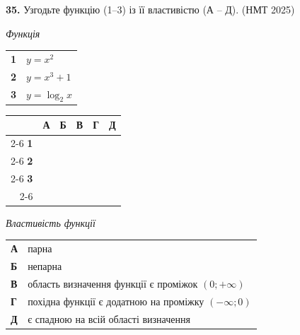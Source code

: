 \documentclass[14pt]{extarticle}
\newcommand{\nmtyear}[1]{\hfill{\small\color{yearcolor}(НМТ #1)}}
\begin{document}
\vspace{0.7cm}

\noindent\textbf{35.} Узгодьте функцію (1–3) із її властивістю (А – Д). \nmtyear{2025}

\vspace{0.3cm}

\noindent
\begin{minipage}[t]{0.45\textwidth}
    \textit{Функція} \par \vspace{0.2cm}
    \begin{tabular}{@{}p{0.5cm} p{5cm}@{}}
    \textbf{1} & $y=x^2$ \\[0.3cm]
    \textbf{2} & $y=x^3+1$ \\[0.3cm]
    \textbf{3} & $y=\log_2 x$ \\
    \end{tabular}
    
    \vspace{0.5cm}
    
    \begingroup
    \setlength{\tabcolsep}{4pt}
    \renewcommand{\arraystretch}{1.2}
    \small
    \begin{tabular}{r|c|c|c|c|c|}
         \multicolumn{1}{c}{} & \multicolumn{1}{c}{\textbf{А}} & \multicolumn{1}{c}{\textbf{Б}} & \multicolumn{1}{c}{\textbf{В}} & \multicolumn{1}{c}{\textbf{Г}} & \multicolumn{1}{c}{\textbf{Д}} \\ \cline{2-6}
         \textbf{1} & & & & & \\ \cline{2-6}
         \textbf{2} & & & & & \\ \cline{2-6}
         \textbf{3} & & & & & \\ \cline{2-6}
    \end{tabular}
    \endgroup
\end{minipage}%
\hfill
\begin{minipage}[t]{0.50\textwidth}
    \textit{Властивість функції} \par \vspace{0.2cm}
    \begin{tabular}{@{}p{0.5cm} p{7.5cm}@{}}
    \textbf{А} & парна \\[0.3cm]
    \textbf{Б} & непарна \\[0.3cm]
    \textbf{В} & область визначення функції є проміжок $(0; +\infty)$ \\[0.3cm]
    \textbf{Г} & похідна функції є додатною на проміжку $(-\infty; 0)$ \\[0.3cm]
    \textbf{Д} & є спадною на всій області визначення \\
    \end{tabular}
\end{minipage}
\end{document}
